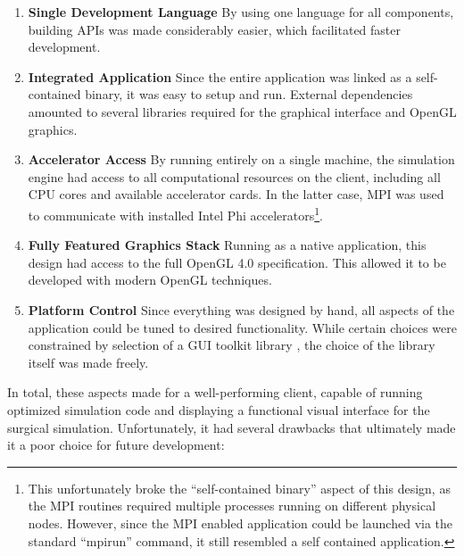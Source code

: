 \begin{enumerate}
  \item \textbf{Single Development Language} By using one language for
    all components, building APIs was made considerably easier, which
    facilitated faster development.

  \item \textbf{Integrated Application} Since the entire application
    was linked as a self-contained binary, it was easy to setup and
    run. External dependencies amounted to several libraries required
    for the graphical interface and OpenGL graphics.

  \item \textbf{Accelerator Access} By running entirely on a single
    machine, the simulation engine had access to all computational
    resources on the client, including all CPU cores and available
    accelerator cards. In the latter case, MPI was used to communicate
    with installed Intel Phi accelerators\footnote{This unfortunately
      broke the ``self-contained binary'' aspect of this design, as
      the MPI routines required multiple processes running on
      different physical nodes. However, since the MPI enabled
      application could be launched via the standard ``mpirun'' command, it
      still resembled a self contained application.}. 

   \item \textbf{Fully Featured Graphics Stack} Running as a native
     application, this design had access to the full OpenGL 4.0
     specification. This allowed it to be developed with modern OpenGL
     techniques.

   \item \textbf{Platform Control} Since everything was designed by
     hand, all aspects of the application could be tuned to desired
     functionality. While certain choices were constrained by
     selection of a GUI toolkit library \citep{wxWid:2017}, the choice of the
     library itself was made freely.
    
\end{enumerate}

 In total, these aspects made for a well-performing client, capable of
 running optimized simulation code and displaying a functional visual
 interface for the surgical simulation. Unfortunately, it had several
 drawbacks that ultimately made it a poor choice for future
 development:

